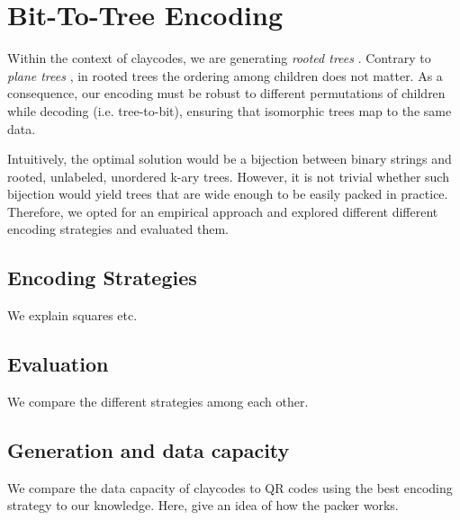 \section{Bit-To-Tree Encoding}

Within the context of claycodes, we are generating \textit{rooted trees} \cite{NAKANORooted}. Contrary to \textit{plane trees} \cite{NAKANOPlane}, in rooted trees the ordering among children does not matter. As a consequence, our encoding must be robust to different permutations of children while decoding (i.e. tree-to-bit), ensuring that isomorphic trees map to the same data.

Intuitively, the optimal solution would be a bijection between binary strings and rooted, unlabeled, unordered k-ary trees. However, it is not trivial whether such bijection would yield trees that are wide enough to be easily packed in practice. Therefore, we opted for an empirical approach and explored different different encoding strategies and evaluated them.

\subsection[strategies]{Encoding Strategies}

We explain squares etc.

\subsection[encodingEval]{Evaluation}

We compare the different strategies among each other.

\subsection[generation]{Generation and data capacity}

We compare the data capacity of claycodes to QR codes using the best encoding strategy to our knowledge. Here, give an idea of how the packer works.
